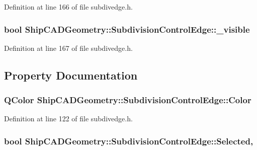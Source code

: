 Definition at line 166 of file subdivedge.\-h.

\hypertarget{classShipCADGeometry_1_1SubdivisionControlEdge_ad89cd12cf61e68944d709ee433c9d7ca}{
\subsubsection[{\-\_\-visible}]{\setlength{\rightskip}{0pt plus 5cm}bool Ship\-C\-A\-D\-Geometry\-::\-Subdivision\-Control\-Edge\-::\-\_\-visible\hspace{0.3cm}{\ttfamily [protected]}}}\label{classShipCADGeometry_1_1SubdivisionControlEdge_ad89cd12cf61e68944d709ee433c9d7ca}


Definition at line 167 of file subdivedge.\-h.



\subsection{Property Documentation}
\hypertarget{classShipCADGeometry_1_1SubdivisionControlEdge_a81cec7ea15307ae2e21cfcc238a059bb}{
\subsubsection[{Color}]{\setlength{\rightskip}{0pt plus 5cm}Q\-Color Ship\-C\-A\-D\-Geometry\-::\-Subdivision\-Control\-Edge\-::\-Color\hspace{0.3cm}{\ttfamily [read]}}}\label{classShipCADGeometry_1_1SubdivisionControlEdge_a81cec7ea15307ae2e21cfcc238a059bb}


Definition at line 122 of file subdivedge.\-h.

\hypertarget{classShipCADGeometry_1_1SubdivisionControlEdge_a6e4209c11ad0d122a6c4465790d2b7e3}{
\subsubsection[{Selected}]{\setlength{\rightskip}{0pt plus 5cm}bool Ship\-C\-A\-D\-Geometry\-::\-Subdivision\-Control\-Edge\-::\-Selected\hspace{0.3cm}{\ttfamily [read]}, {\ttfamily [write]}}}\label{classShipCADGeometry_1_1SubdivisionControlEdge_a6e4209c11ad0d122a6c4465790d2b7e3}


